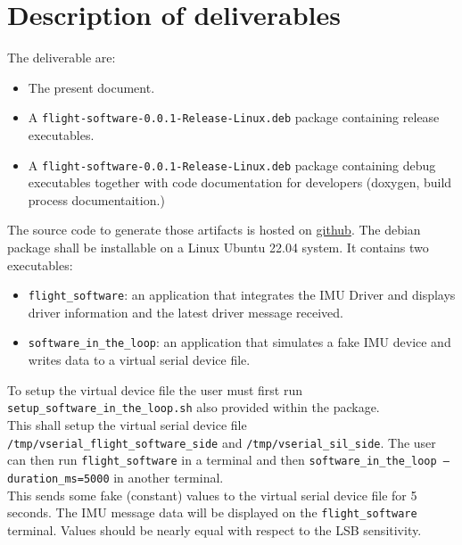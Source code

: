 \section{Description of deliverables}
The deliverable are:
\begin{itemize}
    \item The present document.
    \item A \texttt{flight-software-0.0.1-Release-Linux.deb} package containing release executables.
    \item A \texttt{flight-software-0.0.1-Release-Linux.deb} package containing debug executables together with code documentation for developers (doxygen, build process documentaition.)
\end{itemize}

The source code to generate those artifacts is hosted on \href{https://github.com/renn0xtek9/assignment}{github}.
The debian package shall be installable on a Linux Ubuntu 22.04 system.
It contains two executables:
\begin{itemize}
    \item \texttt{flight\_software}: an application that integrates the IMU Driver and displays driver information and the latest driver message received.
    \item \texttt{software\_in\_the\_loop}: an application that simulates a fake IMU device and writes data to a virtual serial device file.
\end{itemize}
To setup the virtual device file the user must first run \texttt{setup\_software\_in\_the\_loop.sh} also provided within the package.\\
This shall setup the virtual serial device file \texttt{/tmp/vserial\_flight\_software\_side} and \texttt{/tmp/vserial\_sil\_side}. \newline
The user can then run \newline \texttt{flight\_software} \newline in a terminal and then \newline \texttt{software\_in\_the\_loop --duration\_ms=5000} \newline in another terminal. \\
This sends some fake (constant) values to the virtual serial device file for 5 seconds.
The IMU message data will be displayed on the \texttt{flight\_software} terminal. Values should be nearly equal with respect to the LSB sensitivity.

